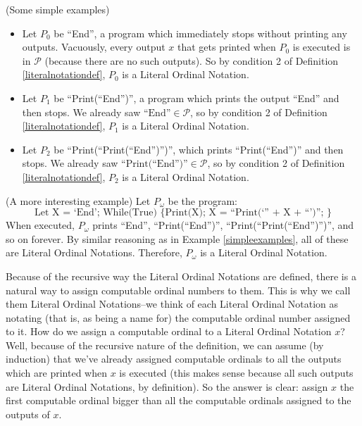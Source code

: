 \documentclass[runningheads]{llncs}
\begin{document}
\begin{example}
\label{simpleexamples}
(Some simple examples)
    \begin{itemize}
    \item
    Let $P_0$ be ``End'', a program which immediately stops without printing any outputs.
    Vacuously, every output $x$ that gets printed when $P_0$ is executed is in $\mathcal P$
    (because there are no such outputs). So by condition 2 of
    Definition \ref{literalnotationdef}, $P_0$ is a Literal Ordinal Notation.
    \item
    Let $P_1$ be ``Print(``End'')'', a program which prints the output ``End'' and then
    stops. We already saw $\mbox{``End''}\in\mathcal P$, so by condition 2 of
    Definition \ref{literalnotationdef}, $P_1$ is a Literal Ordinal Notation.
    \item
    Let $P_2$ be ``Print(``Print(``End'')'')'', which prints ``Print(``End'')'' and then
    stops. We already saw $\mbox{``Print(``End'')''}\in\mathcal P$, so by condition 2
    of Definition \ref{literalnotationdef}, $P_2$ is a Literal Ordinal Notation.
    \end{itemize}
\end{example}

\begin{example}
\label{omegaexample}
(A more interesting example)
    Let $P_\omega$ be the program:
    \[
        \mbox{Let X = `End'; While(True) \{ Print(X); X = ``Print(`'' + X + ``')''; \}}
    \]
    When executed, $P_\omega$ prints ``End'', ``Print(``End'')'',
    ``Print(``Print(``End'')'')'', and so on forever. By similar reasoning as
    in Example \ref{simpleexamples}, all of these are Literal Ordinal Notations.
    Therefore, $P_\omega$ is a Literal Ordinal Notation.
\end{example}

Because of the recursive way the Literal Ordinal Notations are defined, there is a
natural way to assign computable ordinal numbers to them. This is why we call them
Literal Ordinal Notations--we think of each Literal Ordinal Notation as notating
(that is, as being a name for) the computable ordinal number assigned to it.
How do we assign a computable ordinal to a Literal Ordinal Notation $x$? Well, because
of the recursive nature of the definition, we can assume (by induction) that we've
already assigned computable ordinals to all the outputs which are printed when $x$
is executed (this makes sense because all such outputs are Literal Ordinal Notations,
by definition). So the answer is clear: assign $x$ the first computable ordinal bigger
than all the computable ordinals assigned to the outputs of $x$.
\end{document}
